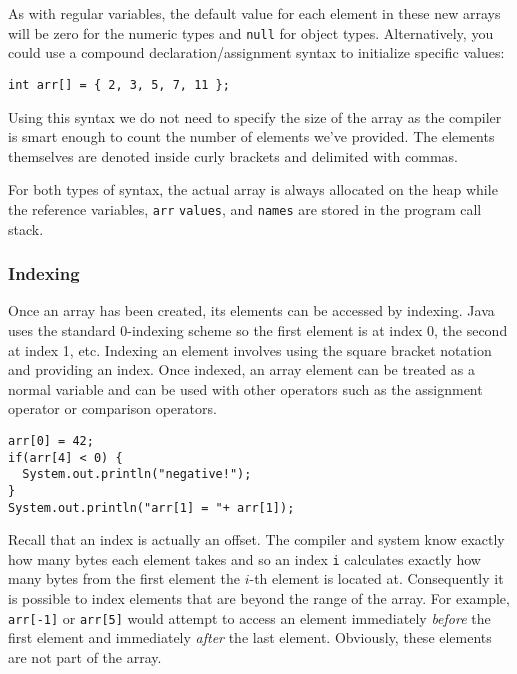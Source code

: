 As with regular variables, the default value for each element in
these new arrays will be zero for the numeric types and \texttt{null}
for object types.  Alternatively, you could use a compound declaration/assignment
syntax to initialize specific values:

\begin{verbatim}
int arr[] = { 2, 3, 5, 7, 11 };
\end{verbatim}

Using this syntax we do not need to specify the size of the array 
as the compiler is smart enough to count the number of elements
we've provided.  The elements themselves are denoted inside curly
brackets and delimited with commas.  

For both types of syntax, the actual array is always allocated on the heap
while the reference variables, \texttt{arr} \texttt{values}, 
and \texttt{names} are stored in the program call stack.

\subsubsection{Indexing}

Once an array has been created, its elements can be accessed
by indexing.  Java uses the standard 0-indexing scheme so the
first element is at index 0, the second at index 1, etc.  Indexing
an element involves using the square bracket notation and
providing an index.  Once indexed, an array element can be
treated as a normal variable and can be used with other operators
such as the assignment operator or comparison operators.

\begin{verbatim}
arr[0] = 42;
if(arr[4] < 0) {
  System.out.println("negative!");
}
System.out.println("arr[1] = "+ arr[1]);
\end{verbatim}

Recall that an index is actually an offset.  The compiler and
system know exactly how many bytes each 
element takes and so an index \texttt{i} calculates
exactly how many bytes from the first element the $i$-th
element is located at.  Consequently it is possible to index
elements that are beyond the range of the array.  For example, 
\texttt{arr[-1]} or \texttt{arr[5]} would attempt
to access an element immediately \emph{before} the first element
and immediately \emph{after} the last element.  Obviously, 
these elements are not part of the array.  

